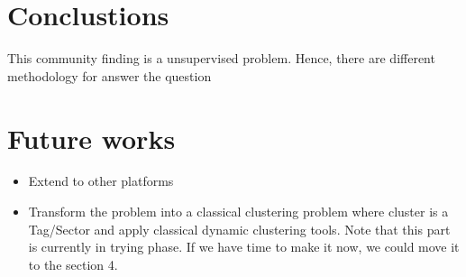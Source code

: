 \section{Conclustions}

This community finding is a unsupervised problem.
Hence, there are different methodology for answer the question


\section{Future works}

\begin{itemize}
	\item Extend to other platforms
	\item Transform the problem into a classical clustering problem where cluster is a Tag/Sector
	      and apply classical dynamic clustering tools.
	      Note that this part is currently in trying phase.
	      If we have time to make it now, we could move it to the section 4.
\end{itemize}